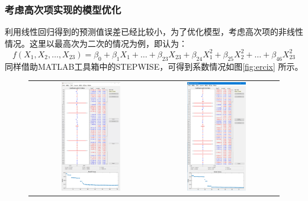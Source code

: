 \documentclass[12pt]{article}%
\begin{document}
\subsubsection{考虑高次项实现的模型优化}
利用线性回归得到的预测值误差已经比较小，为了优化模型，考虑高次项的非线性情况。这里以最高次为二次的情况为例，即认为：
\begin{equation}\label{erci}
  f(X_1,X_2,\ldots,X_{23})=\beta_0+\beta_1 X_1+\ldots+\beta_{23}X_{23}+\beta_{24} X_1^2+\beta_{25}X_2^2+\ldots+\beta_{46}X_{23}^2
\end{equation}
同样借助MATLAB工具箱中的STEPWISE，可得到系数情况如图\ref{fig:ercix}
所示。\\
\begin{figure}[htbp]
  \centering
  \begin{tabular}{cc}
  \includegraphics[width=0.5\textwidth]{picture/PPTT1} & \includegraphics[width=0.5\textwidth]{picture/PPTT2} \\

\end{tabular}
\end{figure}
\end{document}
